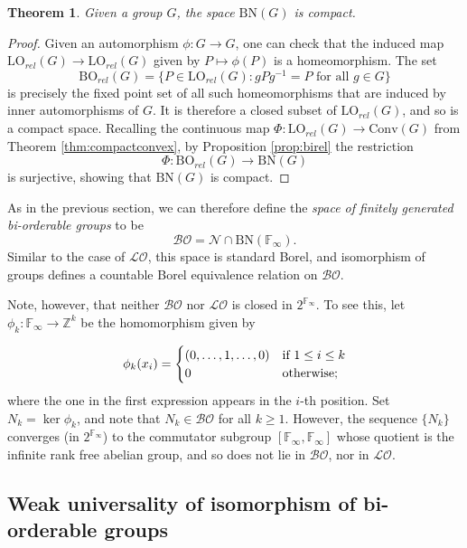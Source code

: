 \documentclass{amsart}
\newtheorem{theorem}{Theorem}[section]
\theoremstyle{definition}
\theoremstyle{remark}
\begin{document}
\begin{theorem}
Given a group $G$, the space $\mathrm{BN}(G)$ is compact.
\end{theorem}
\begin{proof}
Given an automorphism $\phi: G \rightarrow G$, one can check that the induced map $\mathrm{LO}_{rel}(G) \rightarrow \mathrm{LO}_{rel}(G)$ given by $P \mapsto \phi(P)$ is a homeomorphism.  The set 
$$\mathrm{BO}_{rel}(G)  = \{ P \in \mathrm{LO}_{rel}(G) : gPg^{-1} = P \mbox{ for all } g \in G\}$$
is precisely the fixed point set of all such homeomorphisms that are induced by inner automorphisms of $G$.  It is therefore a closed subset of $\mathrm{LO}_{rel}(G)$, and so is a compact space.  Recalling the continuous map $ \Phi \colon \mathrm{LO}_{rel}(G) \rightarrow \mathrm{Conv}(G)$ from Theorem \ref{thm:compactconvex}, by Proposition \ref{prop:birel} the restriction 
\[ \Phi\colon \mathrm{BO}_{rel}(G) \rightarrow \mathrm{BN}(G)
\]
is surjective, showing that $\mathrm{BN}(G)$ is compact.
\end{proof}

As in the previous section, we can therefore define the \emph{space of finitely generated bi-orderable groups} to be 
\[ \mathcal{BO} = \mathcal{N} \cap \mathrm{BN}(\mathbb{F}_\infty).
\]
Similar to the case of $\mathcal{LO}$, this space is standard Borel, and isomorphism of groups defines a countable Borel equivalence relation on $\mathcal{BO}$.

Note, however, that neither $\mathcal{BO}$ nor $\mathcal{LO}$ is closed in $2^{\mathbb{F}_\infty}$.  To see this, let $\phi_k\colon \mathbb{F}_\infty \rightarrow \mathbb{Z}^k$ be the homomorphism given by 

\[
\phi_k(x_i) =
\begin{cases}
    (0, \ldots, 1, \ldots, 0) &\text{if \( 1 \leq i \leq k\)}\\
    0 &\text{otherwise};
\end{cases}
\]
where the one in the first expression appears in the $i$-th position.  Set $N_k = \ker \phi_k$, and note that $N_k \in \mathcal{BO}$ for all $k \geq 1$.  However, the sequence $\{ N_k\}$ converges (in $2^{\mathbb{F}_\infty}$) to the commutator subgroup $[\mathbb{F}_\infty, \mathbb{F}_\infty]$ whose quotient is %
the infinite rank free abelian group, and so does not lie in $\mathcal{BO}$, nor in $\mathcal{LO}$.


\subsection{Weak universality of isomorphism of bi-orderable groups}
\end{document}

